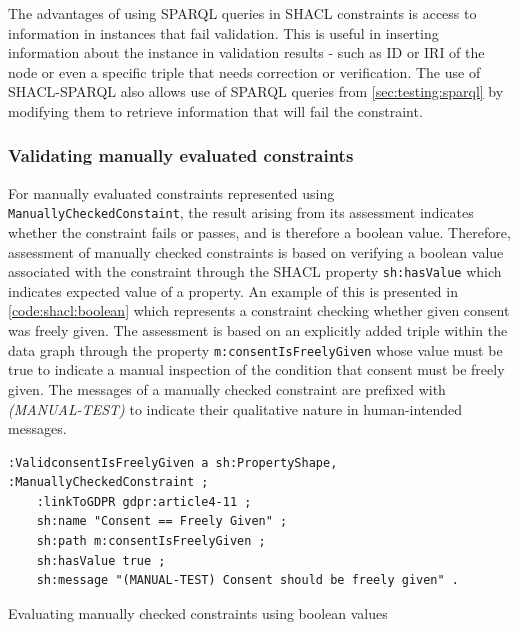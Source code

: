 The advantages of using SPARQL queries in SHACL constraints is access to information in instances that fail validation. This is useful in inserting information about the instance in validation results - such as ID or IRI of the node or even a specific triple that needs correction or verification.
The use of SHACL-SPARQL also allows use of SPARQL queries from \autoref{sec:testing:sparql} by modifying them to retrieve information that will fail the constraint.

\subsubsection{Validating manually evaluated constraints}
For manually evaluated constraints represented using \texttt{ManuallyCheckedConstaint}, the result arising from its assessment indicates whether the constraint fails or passes, and is therefore a boolean value.
Therefore, assessment of manually checked constraints is based on verifying a boolean value associated with the constraint through the SHACL property \texttt{sh:hasValue} which indicates expected value of a property.
An example of this is presented in \autoref{code:shacl:boolean} which represents a constraint checking whether given consent was freely given.
The assessment is based on an explicitly added triple within the data graph through the property \texttt{m:consentIsFreelyGiven} whose value must be true to indicate a manual inspection of the condition that consent must be freely given.
The messages of a manually checked constraint are prefixed with \textit{(MANUAL-TEST)} to indicate their qualitative nature in human-intended messages.
\begin{listing}[htbp]
\begin{verbatim}
:ValidconsentIsFreelyGiven a sh:PropertyShape, :ManuallyCheckedConstraint ;
    :linkToGDPR gdpr:article4-11 ;
    sh:name "Consent == Freely Given" ;
    sh:path m:consentIsFreelyGiven ;
    sh:hasValue true ;
    sh:message "(MANUAL-TEST) Consent should be freely given" .
\end{verbatim}
\caption{Evaluating manually checked constraints using boolean values}
\label{code:shacl:boolean}
\end{listing}

